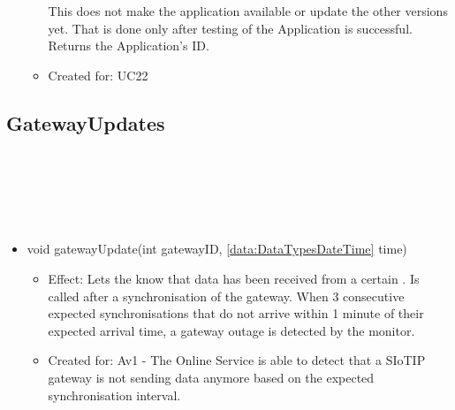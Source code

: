\begin{description}
\begin{itemize}[noitemsep,nolistsep,leftmargin=-.25cm]
\begin{itemize}[noitemsep,nolistsep]
This does not make the application available or update the other versions yet. That is done only after testing of the Application is successful. \\
Returns the Application's ID.
\item Created for: UC22
        \end{itemize}
    \end{itemize}
    \end{description}

  \subsection{GatewayUpdates}\label{int:OnlineServiceOnlineServiceGatewayBrokerGatewayMonitorGatewayUpdates}
    \begin{description}
      \item[Provided by:] \iconcomponent{}~
      \item[Required by:] \iconcomponent{}~
      \item[Operations:] ~
    \begin{itemize}[noitemsep,nolistsep,leftmargin=-.25cm]
      \item \textsf{void gatewayUpdate(int gatewayID, \ref{data:DataTypesDateTime} time)}
        \begin{itemize}[noitemsep,nolistsep]
           \item Effect: Lets the  know that data has been received from a certain . Is called after a synchronisation of the gateway. When 3 consecutive expected synchronisations that do not arrive within 1 minute of their expected arrival time, a gateway outage is detected by the monitor.
\item Created for: Av1 - The Online Service is able to detect that a SIoTIP gateway is not sending data anymore based on the expected synchronisation interval.
        \end{itemize}
    \end{itemize}
    \end{description}

